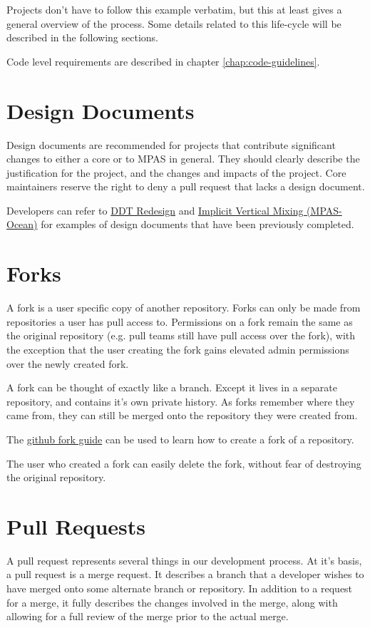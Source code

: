 \documentclass[11pt]{report}
\begin{document}
Projects don't have to follow this example verbatim, but this at least
gives a general overview of the process. Some details related to this
life-cycle will be described in the following sections.

Code level requirements are described in chapter \ref{chap:code-guidelines}.

\section{Design Documents}
\label{sec:design_documents}
Design documents are recommended for projects that contribute significant
changes to either a core or to MPAS in general. They should clearly describe
the justification for the project, and the changes and impacts of the project.
Core maintainers reserve the right to deny a pull request that lacks a design
document.

Developers can refer to
\href{http://mpas-dev.github.com/files/documents/mpas\_ddt\_redesign.pdf}{DDT
Redesign} and
\href{http://mpas-dev.github.com/files/documents/implicit\_vert\_diff\_design.pdf}{Implicit
Vertical Mixing (MPAS-Ocean)} for examples of design documents that have been
previously completed.

\section{Forks}
\label{sec:forks}
A fork is a user specific copy of another repository. Forks can only be made
from repositories a user has pull access to. Permissions on a fork remain the
same as the original repository (e.g. pull teams still have pull access over
the fork), with the exception that the user creating the fork gains elevated
admin permissions over the newly created fork.

A fork can be thought of exactly like a branch. Except it lives in a separate
repository, and contains it's own private history. As forks remember where they
came from, they can still be merged onto the repository they were created from.

The \href{https://help.github.com/articles/fork-a-repo}{github fork guide} can
be used to learn how to create a fork of a repository.

The user who created a fork can easily delete the fork, without fear of
destroying the original repository.

\section{Pull Requests}
\label{sec:pull_request}
A pull request represents several things in our development process. At it's
basis, a pull request is a merge request. It describes a branch that a
developer wishes to have merged onto some alternate branch or repository. In
addition to a request for a merge, it fully describes the changes involved in
the merge, along with allowing for a full review of the merge prior to the
actual merge.
\end{document}
